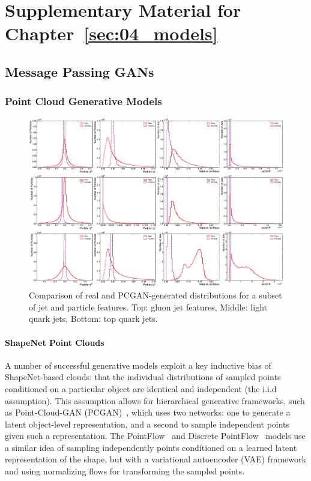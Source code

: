 \chapter{Supplementary Material for Chapter~\ref{sec:04_models}}
\label{app:04_models}

\section{Message Passing GANs}
\label{app:04_mpgan}

\subsection{Point Cloud Generative Models}
\label{app:04_mpgan_pcgen}

\begin{figure}[htpb!]
    \centering
    \centerline{\includegraphics[width=\textwidth]{figures/04-ML4Sim/mpgan/results/pcgan_feature_distributions.pdf}}
    \caption{Comparison of real and PCGAN-generated distributions for a subset of jet and particle features. Top: gluon jet features, Middle: light quark jets, Bottom: top quark jets.}
    \label{fig:04_mpgan_pcgan_results}
\end{figure}

\subsubsection{ShapeNet Point Clouds}
A number of successful generative models exploit a key inductive bias of ShapeNet-based clouds: that the individual distributions of sampled points conditioned on a particular object are identical and independent (the i.i.d assumption). 
This assumption allows for hierarchical generative frameworks, such as Point-Cloud-GAN (PCGAN)~\cite{pcgan}, which uses two networks: one to generate a latent object-level representation, and a second to sample independent points given such a representation.
The PointFlow~\cite{pointflow} and Discrete PointFlow~\cite{discretepointflow} models use a similar idea of sampling independently points conditioned on a learned latent representation of the shape, but with a variational autoencoder (VAE) framework and using normalizing flows for transforming the sampled points. 

